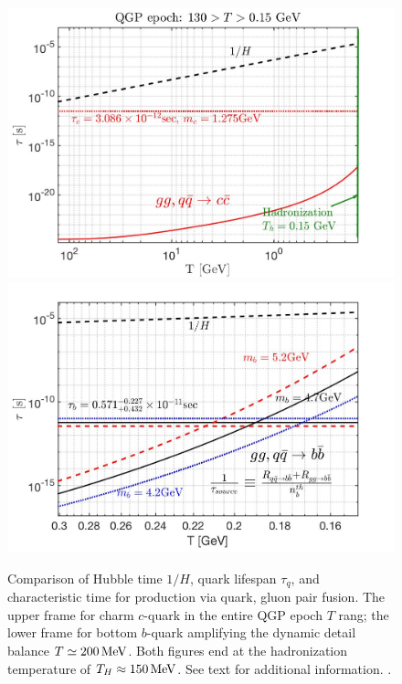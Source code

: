 \begin{figure} 
\centerline{\includegraphics[width=0.49\linewidth]{./plots/CharmQuark_QGP.jpg}
\includegraphics[width=0.49\linewidth]{./plots/BQuarkReactionTime_bottom.jpg}}
\caption{Comparison of Hubble time $1/H$, quark lifespan $\tau_{q}$, and characteristic time for production via quark, gluon pair fusion. The upper frame for charm $c$-quark in the entire QGP epoch $T$ rang; the lower frame for bottom $b$-quark amplifying the dynamic detail balance $T\simeq 200\text{\,MeV}$. Both figures end at the hadronization temperature of $T_{H}\approx150\text{\,MeV}$. See text for additional information. . }
\label{BCreaction:fig}
\end{figure}

